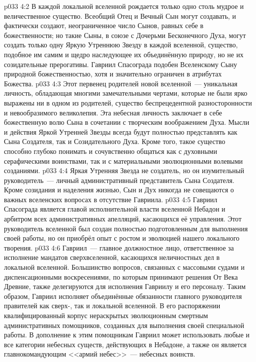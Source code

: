 \vs p033 4:2 В каждой локальной вселенной рождается только одно столь мудрое и величественное существо. Всеобщий Отец и Вечный Сын могут создавать, и фактически создают, неограниченное число Сынов, равных себе в божественности; но такие Сыны, в союзе с Дочерьми Бесконечного Духа, могут создать только одну Яркую Утреннюю Звезду в каждой вселенной, существо, подобное им самим и щедро наследующее их объединённую природу, но не их созидательные прерогативы. Гавриил Спасограда подобен Вселенскому Сыну природной божественностью, хотя и значительно ограничен в атрибутах Божества.
\vs p033 4:3 Этот первенец родителей новой вселенной~--- уникальная личность, обладающая многими замечательными чертами, которые не были ярко выражены ни в одном из родителей, существо беспрецедентной разносторонности и невообразимого великолепия. Эта небесная личность заключает в себе божественную волю Сына в сочетании с творческим воображением Духа. Мысли и действия Яркой Утренней Звезды всегда будут полностью представлять как Сына Создателя, так и Созидательного Духа. Кроме того, такое существо способно глубоко понимать и сочувственно общаться как с духовными серафическими воинствами, так и с материальными эволюционными волевыми созданиями.
\vs p033 4:4 \pc Яркая Утренняя Звезда не создатель, но он изумительный руководитель~--- личный административный представитель Сына Создателя. Кроме созидания и наделения жизнью, Сын и Дух никогда не совещаются о важных вселенских вопросах в отсутствие Гавриила.
\vs p033 4:5 Гавриил Спасограда является главой исполнительной власти вселенной Небадон и арбитром всех административных апелляций, касающихся её управления. Этот руководитель вселенной был создан полностью подготовленным для выполнения своей работы, но он приобрёл опыт с ростом и эволюцией нашего локального творения.
\vs p033 4:6 Гавриил~--- главное должностное лицо, ответственное за исполнение мандатов сверхвселенной, касающихся неличностных дел в локальной вселенной. Большинство вопросов, связанных с массовыми судами и диспенсационными воскресениями, по которым принимают решения От Века Древние, также делегируются для исполнения Гавриилу и его персоналу. Таким образом, Гавриил исполняет объединённые обязанности главного руководителя правителей как сверх-, так и локальной вселенной. В его распоряжении квалифицированный корпус нераскрытых эволюционным смертным административных помощников, созданных для выполнения своей специальной работы. В дополнение к этим помощникам Гавриил может использовать любые и все категории небесных существ, действующих в Небадоне, а также он является главнокомандующим <<армий небес>>~--- небесных воинств.
